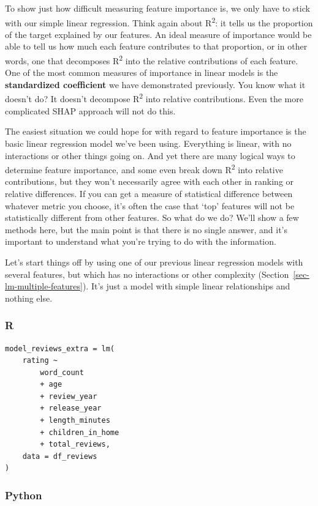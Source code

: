 \documentclass[
  letterpaper,
]{krantz}
\begin{document}
To show just how difficult measuring feature importance is, we only have
to stick with our simple linear regression. Think again about
R\textsuperscript{2}: it tells us the proportion of the target explained
by our features. An ideal measure of importance would be able to tell us
how much each feature contributes to that proportion, or in other words,
one that decomposes R\textsuperscript{2} into the relative contributions
of each feature. One of the most common measures of importance in linear
models is the \textbf{standardized coefficient} we have demonstrated
previously. You know what it doesn't do? It doesn't decompose
R\textsuperscript{2} into relative contributions. Even the more
complicated SHAP approach will not do this.

The easiest situation we could hope for with regard to feature
importance is the basic linear regression model we've been using.
Everything is linear, with no interactions or other things going on. And
yet there are many logical ways to determine feature importance, and
some even break down R\textsuperscript{2} into relative contributions,
but they won't necessarily agree with each other in ranking or relative
differences. If you can get a measure of statistical difference between
whatever metric you choose, it's often the case that `top' features will
not be statistically different from other features. So what do we do?
We'll show a few methods here, but the main point is that there is no
single answer, and it's important to understand what you're trying to do
with the information.

Let's start things off by using one of our previous linear regression
models with several features, but which has no interactions or other
complexity (Section~\ref{sec-lm-multiple-features}). It's just a model
with simple linear relationships and nothing else.

\subsubsection{R}

\begin{verbatim}
model_reviews_extra = lm(
    rating ~
        word_count
        + age
        + review_year
        + release_year
        + length_minutes
        + children_in_home
        + total_reviews,
    data = df_reviews
)
\end{verbatim}

\subsubsection{Python}
\end{document}
